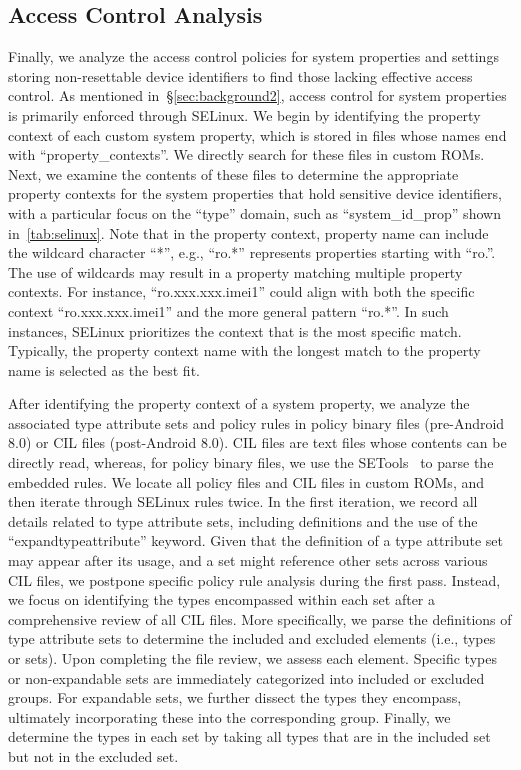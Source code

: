 \subsection{Access Control Analysis}
\label{sec:approachaccess}
Finally, we analyze the access control policies for system properties and settings storing non-resettable device identifiers to find those lacking effective access control.
As mentioned in~\S\ref{sec:background2}, access control for system properties is primarily enforced through SELinux. 
We begin by identifying the property context of each custom system property, which is stored in files whose names end with ``property\_contexts''. We directly search for these files in custom ROMs.
Next, we examine the contents of these files to determine the appropriate property contexts for the system properties that hold sensitive device identifiers, with a particular focus on the ``type'' domain, such as ``system\_id\_prop'' shown in~\autoref{tab:selinux}.
Note that in the property context, property name can include the wildcard character ``*'', e.g., ``ro.*'' represents properties starting with ``ro.''.
The use of wildcards may result in a property matching multiple property contexts. 
For instance, ``ro.xxx.xxx.imei1'' could align with both the specific context ``ro.xxx.xxx.imei1'' and the more general pattern ``ro.*''. 
In such instances, SELinux prioritizes the context that is the most specific match. Typically, the property context name with the longest match to the property name is selected as the best fit.

After identifying the property context of a system property, we analyze the associated type attribute sets and policy rules in policy binary files (pre-Android 8.0) or CIL files (post-Android 8.0). 
CIL files are text files whose contents can be directly read, whereas, for policy binary files, we use the SETools~\cite{setools} to parse the embedded rules.
We locate all policy files and CIL files in custom ROMs, and then iterate through SELinux rules twice.
In the first iteration, we record all details related to type attribute sets, including definitions and the use of the ``expandtypeattribute'' keyword.
Given that the definition of a type attribute set may appear after its usage, and a set might reference other sets across various CIL files, we postpone specific policy rule analysis during the first pass.
Instead, we focus on identifying the types encompassed within each set after a comprehensive review of all CIL files.
More specifically, we parse the definitions of type attribute sets to determine the included and excluded elements (i.e., types or sets). 
Upon completing the file review, we assess each element. 
Specific types or non-expandable sets are immediately categorized into included or excluded groups.
For expandable sets, we further dissect the types they encompass, ultimately incorporating these into the corresponding group. 
Finally, we determine the types in each set by taking all types that are in the included set but not in the excluded set.

